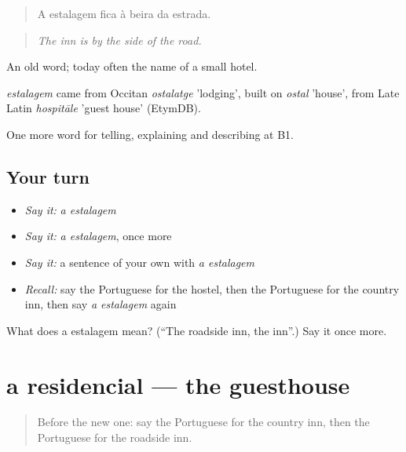 \begin{quote}
A estalagem fica à beira da estrada.
\end{quote}

\begin{quote}
\emph{The inn is by the side of the road.}
\end{quote}

An old word; today often the name of a small hotel.

\begin{cousinweb}
\emph{estalagem} came from Occitan \emph{ostalatge} 'lodging', built on \emph{ostal} 'house', from Late Latin \emph{hospitāle} 'guest house' (EtymDB).
\end{cousinweb}

\begin{grammarlens}[title={What you've built}]
One more word for telling, explaining and describing at B1.
\end{grammarlens}

\subsection*{Your turn}
\begin{itemize}
\raggedright
  \item \emph{Say it:} \emph{a estalagem}
  \item \emph{Say it:} \emph{a estalagem}, once more
  \item \emph{Say it:} a sentence of your own with \emph{a estalagem}
  \item \emph{Recall:} say the Portuguese for the hostel, then the Portuguese for the country inn, then say \emph{a estalagem} again
\end{itemize}

\begin{tcolorbox}[breakable,colback=teal!4,colframe=teal!35!black,title={Before you move on}]
What does a estalagem mean? (\textquotedblleft{}The roadside inn, the inn\textquotedblright{}.) Say it once more.
\end{tcolorbox}
\section[a residencial]{a residencial — the guesthouse}

\label{lesson:PT-C425-residencial}



\begin{quote}
Before the new one: say the Portuguese for the country inn, then the Portuguese for the roadside inn.
\end{quote}

